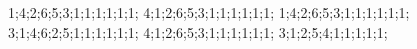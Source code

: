 1;4;2;6;5;3;1;1;1;1;1;1;
4;1;2;6;5;3;1;1;1;1;1;1;
1;4;2;6;5;3;1;1;1;1;1;1;
3;1;4;6;2;5;1;1;1;1;1;1;
4;1;2;6;5;3;1;1;1;1;1;1;
3;1;2;5;4;1;1;1;1;1;
